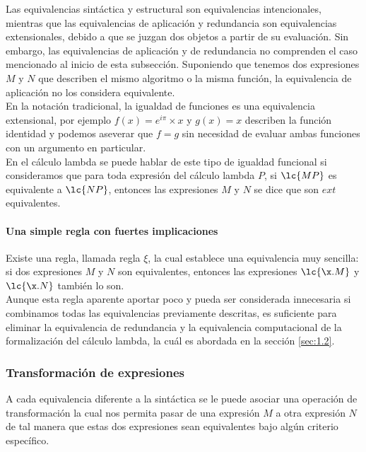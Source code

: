 Las equivalencias sintáctica y estructural son equivalencias intencionales,
mientras que las equivalencias de aplicación y redundancia son equivalencias
extensionales, debido a que se juzgan dos objetos a partir de su evaluación. Sin
embargo, las equivalencias de aplicación y de redundancia no comprenden el caso
mencionado al inicio de esta subsección. Suponiendo que tenemos dos expresiones
\(M\) y \(N\) que describen el mismo algoritmo o la misma función, la
equivalencia de aplicación no los considera equivalente.\\

En la notación tradicional, la igualdad de funciones es una equivalencia
extensional, por ejemplo \(f(x) = e^{i\pi}\times x\) y \(g(x) = x\) describen la
función identidad y podemos aseverar que \(f=g\) sin necesidad de evaluar ambas
funciones con un argumento en particular.\\

En el cálculo lambda se puede hablar de este tipo de igualdad funcional si
consideramos que para toda expresión del cálculo lambda \(P\), si \(\lc{M P}\)
es equivalente a \(\lc{N P}\), entonces las expresiones \(M\) y \(N\) se dice
que son \(ext\) equivalentes.\\

\paragraph{Una simple regla con fuertes implicaciones}

Existe una regla, llamada regla \(\xi\), la cual establece una equivalencia muy
sencilla: si dos expresiones \(M\) y \(N\) son equivalentes, entonces las
expresiones \(\lc{\x.M}\) y \(\lc{\x.N}\) también lo son.\\

Aunque esta regla aparente aportar poco y pueda ser considerada innecesaria si
combinamos todas las equivalencias previamente descritas, es suficiente para
eliminar la equivalencia de redundancia y la equivalencia computacional de la
formalización del cálculo lambda, la cuál es abordada en la sección \ref{sec:1.2}.\\


\subsubsection{Transformación de expresiones}

A cada equivalencia diferente a la sintáctica se le puede asociar una operación de
transformación la cual nos permita pasar de una expresión \(M\) a otra expresión
\(N\) de tal manera que estas dos expresiones sean equivalentes bajo algún
criterio específico.\\

